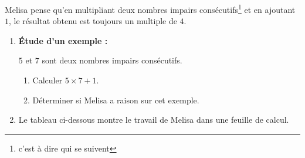 \begin{exercice*}
    Melisa pense qu'en multipliant deux nombres impairs consécutifs\footnote{c'est à dire qui se suivent} et en ajoutant $1$, le résultat obtenu est toujours un multiple de $4$.
    \begin{enumerate}
        \item {\bfseries Étude d'un exemple : }
        
        $5$ et $7$ sont deux nombres impairs consécutifs.
        \begin{enumerate}
            \item Calculer $5\times 7 + 1$.
            \item Déterminer si Melisa a raison sur cet exemple.
        \end{enumerate}
        \item \tableurLogo Le tableau ci-dessous montre le travail de Melisa dans une feuille de calcul.
        

\end{enumerate}
\end{exercice*}
